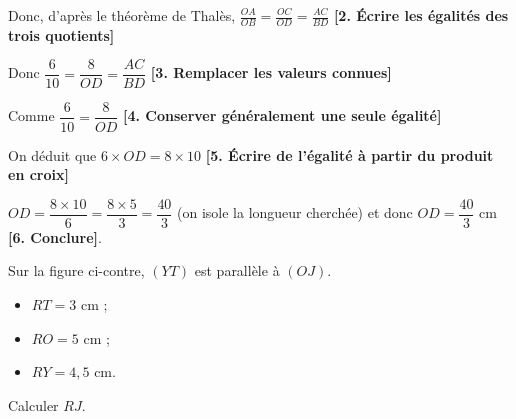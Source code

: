\begin{pageCours}
\begin{ExCor}
\vspace{0.1cm}

Donc, d'après le théorème de Thalès, $\frac{OA}{OB}=\frac{OC}{OD}=\frac{AC}{BD}$ {\color{sacado_blue}\textbf{[2. Écrire les égalités des trois quotients]}}

Donc $\dfrac{6}{10}=\dfrac{8}{OD}=\dfrac{AC}{BD}$ {\color{sacado_blue}\textbf{[3. Remplacer les valeurs connues]}}

Comme $\dfrac{6}{10}=\dfrac{8}{OD}$ {\color{sacado_blue}\textbf{[4. Conserver généralement une seule égalité]}}

On déduit que $6\times OD=8 \times 10$ {\color{sacado_blue}\textbf{[5. Écrire de l'égalité à partir du produit en croix]}}

$OD= \dfrac{8 \times 10}{6}= \dfrac{8 \times 5}{3}= \dfrac{40}{3}$  (on \og isole \fg{} la longueur cherchée) et donc $OD=\dfrac{40}{3}$ cm {\color{sacado_blue}\textbf{[6. Conclure]}}.
\end{ExCor}











\begin{ExCor}

\begin{minipage}{8.cm}

Sur la figure ci-contre, $\left(YT\right)$ est parallèle à $\left(OJ\right)$.

\begin{itemize}
\item  $RT = 3$ cm ;
\item  $RO = 5$ cm ;
\item  $RY = 4,5$ cm.
\end{itemize}

Calculer $RJ$.

\vspace{0.2cm}
 
\end{minipage}
\begin{minipage}{8.cm}


\end{minipage}
\end{ExCor}
\end{pageCours}
